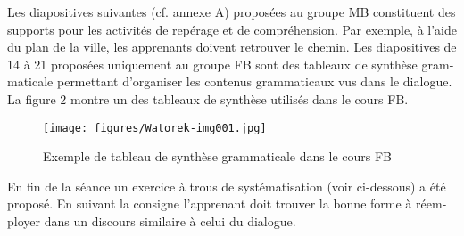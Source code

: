 \documentclass[output=paper]{langscibook}
\begin{document}
\begin{otherlanguage}{french}
\begin{xlist}[Monika:]



\end{xlist}
\z
\z

Les diapositives suivantes (cf. annexe A) proposées au groupe MB constituent des supports pour les activités de repérage et de compréhension. Par exemple, à l’aide du plan de la ville, les apprenants doivent retrouver le chemin. Les diapositives de 14 à 21 proposées uniquement au groupe FB sont des tableaux de synthèse grammaticale permettant d’organiser les contenus grammaticaux vus dans le dialogue. La figure 2 montre un des tableaux de synthèse utilisés dans le cours FB.

  
\begin{figure}
% 
\caption{\label{fig:watorek:2}Exemple de tableau de synthèse grammaticale dans le cours FB}
\texttt{[image: figures/Watorek-img001.jpg]}
\end{figure}
 


En fin de la séance un exercice à trous de systématisation (voir ci-dessous) a été proposé. En suivant la consigne l’apprenant doit trouver la bonne forme à réemployer dans un discours similaire à celui du dialogue. 



\end{otherlanguage}
\end{document}

